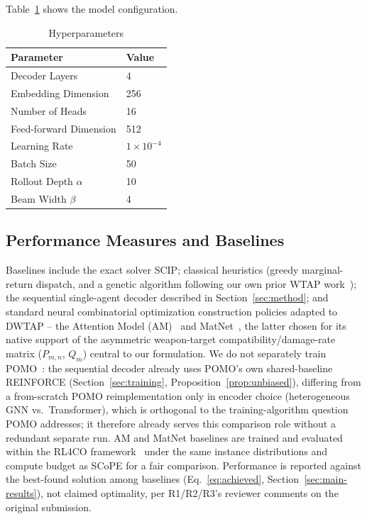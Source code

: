 \documentclass[smallcondensed]{svjour3}
\begin{document}
Table~\ref{tab:hyperparameters} shows the model configuration.

\begin{table}[htbp]
\centering
\small
\caption{Hyperparameters}
\label{tab:hyperparameters}
\begin{tabular}{ll}
\hline
\textbf{Parameter} & \textbf{Value} \\ \hline
Decoder Layers & 4 \\
Embedding Dimension & 256 \\
Number of Heads & 16 \\
Feed-forward Dimension & 512 \\
Learning Rate & $1 \times 10^{-4}$ \\
Batch Size & 50 \\
Rollout Depth $\alpha$ & 10 \\
Beam Width $\beta$ & 4 \\ \hline
\end{tabular}
\end{table}

\subsection{Performance Measures and Baselines}

Baselines include the exact solver SCIP; classical heuristics (greedy marginal-return dispatch, and a genetic algorithm following our own prior WTAP work~\cite{lee2003genetic}); the sequential single-agent decoder described in Section~\ref{sec:method}; and standard neural combinatorial optimization construction policies adapted to DWTAP -- the Attention Model (AM)~\cite{kool2018attention} and MatNet~\cite{kwon2021matrix}, the latter chosen for its native support of the asymmetric weapon-target compatibility/damage-rate matrix ($P_{m,n}$, $Q_m$) central to our formulation. We do not separately train POMO~\cite{kwon2020pomo}: the sequential decoder already uses POMO's own shared-baseline REINFORCE (Section~\ref{sec:training}, Proposition~\ref{prop:unbiased}), differing from a from-scratch POMO reimplementation only in encoder choice (heterogeneous GNN vs.\ Transformer), which is orthogonal to the training-algorithm question POMO addresses; it therefore already serves this comparison role without a redundant separate run. AM and MatNet baselines are trained and evaluated within the RL4CO framework~\cite{berto2023rl4co} under the same instance distributions and compute budget as SCoPE for a fair comparison. Performance is reported against the best-found solution among baselines (Eq.~\eqref{eq:achieved}, Section~\ref{sec:main-results}), not claimed optimality, per R1/R2/R3's reviewer comments on the original submission.
\end{document}

